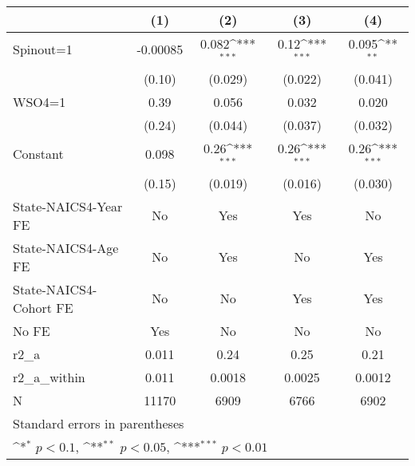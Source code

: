 {
\def\sym#1{\ifmmode^{#1}\else\(^{#1}\)\fi}
\begin{tabular}{l*{4}{c}}
\hline\hline
                    &\multicolumn{1}{c}{(1)}         &\multicolumn{1}{c}{(2)}         &\multicolumn{1}{c}{(3)}         &\multicolumn{1}{c}{(4)}         \\
\hline
Spinout=1           &    -0.00085         &       0.082\sym{***}&        0.12\sym{***}&       0.095\sym{**} \\
                    &      (0.10)         &     (0.029)         &     (0.022)         &     (0.041)         \\
[1em]
WSO4=1              &        0.39         &       0.056         &       0.032         &       0.020         \\
                    &      (0.24)         &     (0.044)         &     (0.037)         &     (0.032)         \\
[1em]
Constant            &       0.098         &        0.26\sym{***}&        0.26\sym{***}&        0.26\sym{***}\\
                    &      (0.15)         &     (0.019)         &     (0.016)         &     (0.030)         \\
[1em]
State-NAICS4-Year FE&          No         &         Yes         &         Yes         &          No         \\
[1em]
State-NAICS4-Age FE &          No         &         Yes         &          No         &         Yes         \\
[1em]
State-NAICS4-Cohort FE&          No         &          No         &         Yes         &         Yes         \\
[1em]
No FE               &         Yes         &          No         &          No         &          No         \\
\hline
r2\_a                &       0.011         &        0.24         &        0.25         &        0.21         \\
r2\_a\_within         &       0.011         &      0.0018         &      0.0025         &      0.0012         \\
N                   &       11170         &        6909         &        6766         &        6902         \\
\hline\hline
\multicolumn{5}{l}{\footnotesize Standard errors in parentheses}\\
\multicolumn{5}{l}{\footnotesize \sym{*} \(p<0.1\), \sym{**} \(p<0.05\), \sym{***} \(p<0.01\)}\\
\end{tabular}
}
